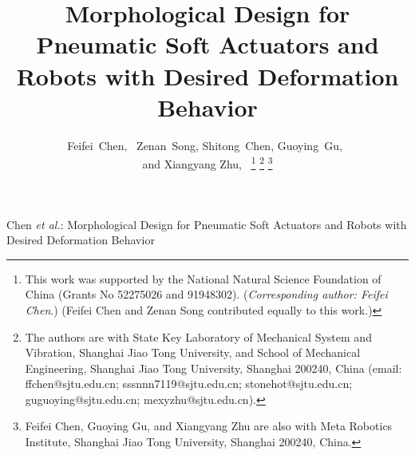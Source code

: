 \documentclass[journal]{IEEEtran}
\theoremstyle{definition}
\begin{document}
%
\title{Morphological Design for Pneumatic Soft Actuators and Robots with Desired Deformation Behavior}
\author{Feifei~Chen,~
  Zenan~Song,
  Shitong~Chen,
  Guoying~Gu,~\\
  and Xiangyang Zhu,~%
  \thanks{This work was supported by the National Natural Science Foundation of China (Grants No 52275026 and 91948302). (\textit{Corresponding author: Feifei Chen}.) (Feifei Chen and Zenan Song contributed equally to this work.)}
  \thanks{The authors are with  State Key Laboratory of Mechanical System and Vibration, Shanghai Jiao Tong University, and School of Mechanical Engineering, Shanghai Jiao Tong University, Shanghai 200240, China (email: ffchen@sjtu.edu.cn; sssnnn7119@sjtu.edu.cn; stonehot@sjtu.edu.cn; guguoying@sjtu.edu.cn; mexyzhu@sjtu.edu.cn).}
  \thanks{Feifei Chen, Guoying Gu, and Xiangyang Zhu are also with Meta Robotics Institute, Shanghai Jiao Tong University, Shanghai 200240, China.}%
}

%
{Chen \MakeLowercase{\textit{et al.}}: Morphological Design for Pneumatic Soft Actuators and Robots with Desired Deformation Behavior}

\maketitle
\end{document}
